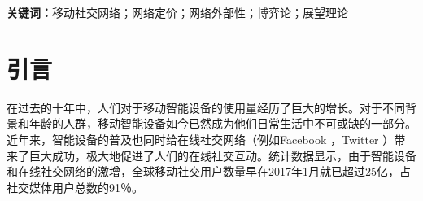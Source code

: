 \textbf{关键词：}移动社交网络；网络定价；网络外部性；博弈论；展望理论

\section{引言}

在过去的十年中，人们对于移动智能设备的使用量经历了巨大的增长。对于不同背景和年龄的人群，移动智能设备如今已然成为他们日常生活中不可或缺的一部分。近年来，智能设备的普及也同时给在线社交网络（例如Facebook \cite{FB}，Twitter \cite{Twitter}）带来了巨大成功，极大地促进了人们的在线社交互动。统计数据显示，由于智能设备和在线社交网络的激增，全球移动社交用户数量早在2017年1月就已超过25亿，占社交媒体用户总数的91％\cite{Wearesocial}。

